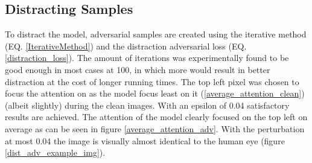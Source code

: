 \subsection*{Distracting Samples}
To distract the model, adversarial samples are created using the iterative method (EQ. \ref{IterativeMethod}) and the distraction adversarial loss (EQ. \ref{distraction_loss}). The amount of iterations was experimentally found to be good enough in most cases at 100, in which more would result in better distraction at the cost of longer running times. The top left pixel was chosen to focus the attention on as the model focus least on it (\ref{average_attention_clean}) (albeit slightly) during the clean images. With an epsilon of 0.04 satisfactory results are achieved. The attention of the model clearly focused on the top left on average as can be seen in figure \ref{average_attention_adv}. With the perturbation at most 0.04 the image is visually almost identical to the human eye (figure \ref{dist_adv_example_img}).


